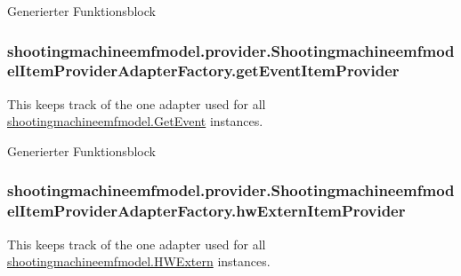 Generierter Funktionsblock \hypertarget{classshootingmachineemfmodel_1_1provider_1_1_shootingmachineemfmodel_item_provider_adapter_factory_af2728621ead83dff85b3d646cc076ca8}{
\subsubsection[{get\-Event\-Item\-Provider}]{ shootingmachineemfmodel.\-provider.\-Shootingmachineemfmodel\-Item\-Provider\-Adapter\-Factory.\-get\-Event\-Item\-Provider\hspace{0.3cm}{\ttfamily [protected]}}}\label{classshootingmachineemfmodel_1_1provider_1_1_shootingmachineemfmodel_item_provider_adapter_factory_af2728621ead83dff85b3d646cc076ca8}
This keeps track of the one adapter used for all \hyperlink{interfaceshootingmachineemfmodel_1_1_get_event}{shootingmachineemfmodel.\-Get\-Event} instances.

Generierter Funktionsblock \hypertarget{classshootingmachineemfmodel_1_1provider_1_1_shootingmachineemfmodel_item_provider_adapter_factory_a043dd5416233a000b0059b95bc8c6239}{
\subsubsection[{hw\-Extern\-Item\-Provider}]{ shootingmachineemfmodel.\-provider.\-Shootingmachineemfmodel\-Item\-Provider\-Adapter\-Factory.\-hw\-Extern\-Item\-Provider\hspace{0.3cm}{\ttfamily [protected]}}}\label{classshootingmachineemfmodel_1_1provider_1_1_shootingmachineemfmodel_item_provider_adapter_factory_a043dd5416233a000b0059b95bc8c6239}
This keeps track of the one adapter used for all \hyperlink{interfaceshootingmachineemfmodel_1_1_h_w_extern}{shootingmachineemfmodel.\-H\-W\-Extern} instances.

